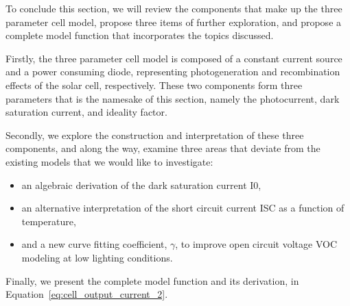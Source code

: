 To conclude this section, we will review the components that make up the three
parameter cell model, propose three items of further exploration, and propose a
complete model function that incorporates the topics discussed.

Firstly, the three parameter cell model is composed of a constant current source
and a power consuming diode, representing photogeneration and recombination
effects of the solar cell, respectively. These two components form three
parameters that is the namesake of this section, namely the photocurrent, dark
saturation current, and ideality factor.

Secondly, we explore the construction and interpretation of these three
components, and along the way, examine three areas that deviate from the
existing models that we would like to investigate:

\begin{itemize}
    \item an algebraic derivation of the dark saturation current \ac{I0},
    \item an alternative interpretation of the short circuit current \ac{ISC} as
    a function of temperature,
    \item and a new curve fitting coefficient, $\gamma$, to improve open circuit
    voltage \ac{VOC} modeling at low lighting conditions.
\end{itemize}

Finally, we present the complete model function and its derivation, in
Equation~\ref{eq:cell_output_current_2}.

